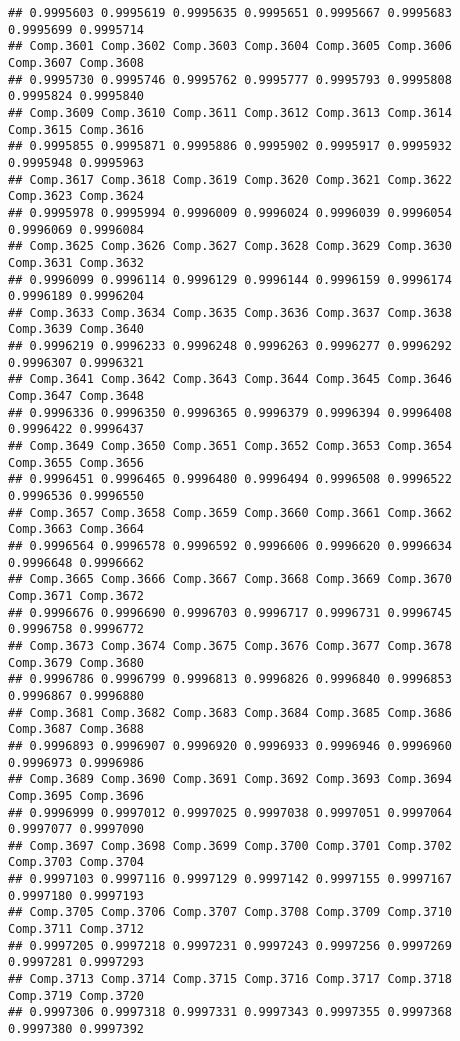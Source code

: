 \documentclass[
]{article}
\begin{document}
\begin{verbatim}
## 0.9995603 0.9995619 0.9995635 0.9995651 0.9995667 0.9995683 0.9995699 0.9995714 
## Comp.3601 Comp.3602 Comp.3603 Comp.3604 Comp.3605 Comp.3606 Comp.3607 Comp.3608 
## 0.9995730 0.9995746 0.9995762 0.9995777 0.9995793 0.9995808 0.9995824 0.9995840 
## Comp.3609 Comp.3610 Comp.3611 Comp.3612 Comp.3613 Comp.3614 Comp.3615 Comp.3616 
## 0.9995855 0.9995871 0.9995886 0.9995902 0.9995917 0.9995932 0.9995948 0.9995963 
## Comp.3617 Comp.3618 Comp.3619 Comp.3620 Comp.3621 Comp.3622 Comp.3623 Comp.3624 
## 0.9995978 0.9995994 0.9996009 0.9996024 0.9996039 0.9996054 0.9996069 0.9996084 
## Comp.3625 Comp.3626 Comp.3627 Comp.3628 Comp.3629 Comp.3630 Comp.3631 Comp.3632 
## 0.9996099 0.9996114 0.9996129 0.9996144 0.9996159 0.9996174 0.9996189 0.9996204 
## Comp.3633 Comp.3634 Comp.3635 Comp.3636 Comp.3637 Comp.3638 Comp.3639 Comp.3640 
## 0.9996219 0.9996233 0.9996248 0.9996263 0.9996277 0.9996292 0.9996307 0.9996321 
## Comp.3641 Comp.3642 Comp.3643 Comp.3644 Comp.3645 Comp.3646 Comp.3647 Comp.3648 
## 0.9996336 0.9996350 0.9996365 0.9996379 0.9996394 0.9996408 0.9996422 0.9996437 
## Comp.3649 Comp.3650 Comp.3651 Comp.3652 Comp.3653 Comp.3654 Comp.3655 Comp.3656 
## 0.9996451 0.9996465 0.9996480 0.9996494 0.9996508 0.9996522 0.9996536 0.9996550 
## Comp.3657 Comp.3658 Comp.3659 Comp.3660 Comp.3661 Comp.3662 Comp.3663 Comp.3664 
## 0.9996564 0.9996578 0.9996592 0.9996606 0.9996620 0.9996634 0.9996648 0.9996662 
## Comp.3665 Comp.3666 Comp.3667 Comp.3668 Comp.3669 Comp.3670 Comp.3671 Comp.3672 
## 0.9996676 0.9996690 0.9996703 0.9996717 0.9996731 0.9996745 0.9996758 0.9996772 
## Comp.3673 Comp.3674 Comp.3675 Comp.3676 Comp.3677 Comp.3678 Comp.3679 Comp.3680 
## 0.9996786 0.9996799 0.9996813 0.9996826 0.9996840 0.9996853 0.9996867 0.9996880 
## Comp.3681 Comp.3682 Comp.3683 Comp.3684 Comp.3685 Comp.3686 Comp.3687 Comp.3688 
## 0.9996893 0.9996907 0.9996920 0.9996933 0.9996946 0.9996960 0.9996973 0.9996986 
## Comp.3689 Comp.3690 Comp.3691 Comp.3692 Comp.3693 Comp.3694 Comp.3695 Comp.3696 
## 0.9996999 0.9997012 0.9997025 0.9997038 0.9997051 0.9997064 0.9997077 0.9997090 
## Comp.3697 Comp.3698 Comp.3699 Comp.3700 Comp.3701 Comp.3702 Comp.3703 Comp.3704 
## 0.9997103 0.9997116 0.9997129 0.9997142 0.9997155 0.9997167 0.9997180 0.9997193 
## Comp.3705 Comp.3706 Comp.3707 Comp.3708 Comp.3709 Comp.3710 Comp.3711 Comp.3712 
## 0.9997205 0.9997218 0.9997231 0.9997243 0.9997256 0.9997269 0.9997281 0.9997293 
## Comp.3713 Comp.3714 Comp.3715 Comp.3716 Comp.3717 Comp.3718 Comp.3719 Comp.3720 
## 0.9997306 0.9997318 0.9997331 0.9997343 0.9997355 0.9997368 0.9997380 0.9997392 

\end{verbatim}
\end{document}
